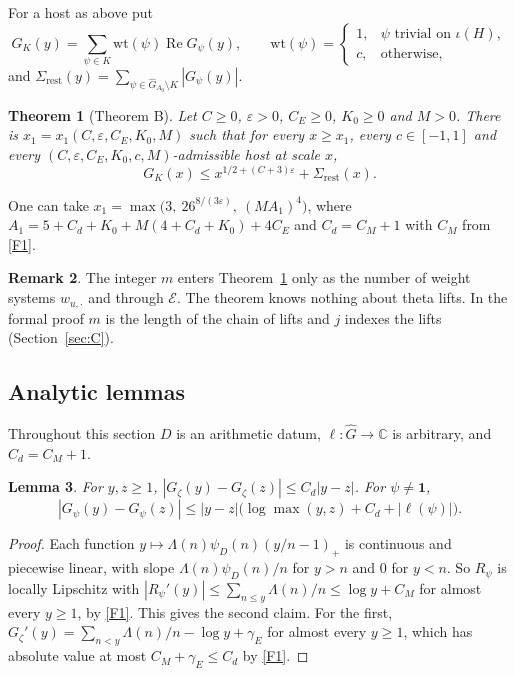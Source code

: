 \documentclass[11pt]{amsart}
\newcommand{\CC}{\mathbb{C}}
\newcommand{\eps}{\varepsilon}
\newcommand{\re}{\operatorname{Re}}
\newcommand{\gE}{\gamma_{E}}
\newcommand{\Gh}{\widehat{G}}
\theoremstyle{plain}
\newtheorem{theorem}{Theorem}[section]
\newtheorem{lemma}[theorem]{Lemma}
\theoremstyle{definition}
\newtheorem{remark}[theorem]{Remark}
\numberwithin{equation}{section}
\begin{document}
For a host as above put
\[
G_K(y)=\sum_{\psi\in K}\mathrm{wt}(\psi)\re G_\psi(y),\qquad
\mathrm{wt}(\psi)=\begin{cases}1,&\psi\text{ trivial on }\iota(H),\\ c,&\text{otherwise},\end{cases}
\]
and $\Sigma_{\mathrm{rest}}(y)=\sum_{\psi\in\Gh_{A_0}\setminus K}|G_\psi(y)|$.

\begin{theorem}[Theorem B]\label{thm:B}
Let $C\ge0$, $\eps>0$, $C_E\ge0$, $K_0\ge0$ and $M>0$. There is $x_1=x_1(C,\eps,C_E,K_0,M)$ such
that for every $x\ge x_1$, every $c\in[-1,1]$ and every $(C,\eps,C_E,K_0,c,M)$-admissible host at
scale $x$,
\[
G_K(x)\le x^{1/2+(C+3)\eps}+\Sigma_{\mathrm{rest}}(x).
\]
\end{theorem}

One can take $x_1=\max\bigl(3,\ 26^{8/(3\eps)},\ (MA_1)^4\bigr)$, where
$A_1=5+C_d+K_0+M(4+C_d+K_0)+4C_E$ and $C_d=C_M+1$ with $C_M$ from \ref{F1}.

\begin{remark}
The integer $m$ enters Theorem~\ref{thm:B} only as the number of weight systems $w_{u,\cdot}$ and
through $\mathcal E$. The theorem knows nothing about theta lifts. In the formal proof $m$ is the
length of the chain of lifts and $j$ indexes the lifts (Section~\ref{sec:C}).
\end{remark}

\subsection{Analytic lemmas}

Throughout this section $D$ is an arithmetic datum, $\ell:\Gh\to\CC$ is arbitrary, and
$C_d=C_M+1$.

\begin{lemma}\label{lem:deriv}
For $y,z\ge1$, $|G_\zeta(y)-G_\zeta(z)|\le C_d|y-z|$. For $\psi\neq\mathbf 1$,
\[
|G_\psi(y)-G_\psi(z)|\le|y-z|\bigl(\log\max(y,z)+C_d+|\ell(\psi)|\bigr).
\]
\end{lemma}

\begin{proof}
Each function $y\mapsto\Lambda(n)\psi_D(n)(y/n-1)_+$ is continuous and piecewise linear, with slope
$\Lambda(n)\psi_D(n)/n$ for $y>n$ and $0$ for $y<n$. So $R_\psi$ is locally Lipschitz with
$|R_\psi'(y)|\le\sum_{n\le y}\Lambda(n)/n\le\log y+C_M$ for almost every $y\ge1$, by \ref{F1}. This
gives the second claim. For the first, $G_\zeta'(y)=\sum_{n<y}\Lambda(n)/n-\log y+\gE$ for almost
every $y\ge1$, which has absolute value at most $C_M+\gE\le C_d$ by \ref{F1}.
\end{proof}
\end{document}
